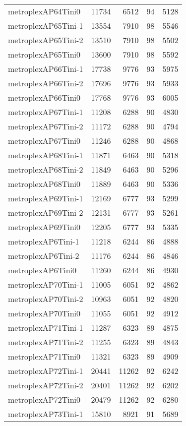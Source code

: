 \begin{longtable}{lrrrr}
metroplexAP64Tini0 & 11734 & 6512 & 94 & 5128 \\
metroplexAP65Tini-1 & 13554 & 7910 & 98 & 5546 \\
metroplexAP65Tini-2 & 13510 & 7910 & 98 & 5502 \\
metroplexAP65Tini0 & 13600 & 7910 & 98 & 5592 \\
metroplexAP66Tini-1 & 17738 & 9776 & 93 & 5975 \\
metroplexAP66Tini-2 & 17696 & 9776 & 93 & 5933 \\
metroplexAP66Tini0 & 17768 & 9776 & 93 & 6005 \\
metroplexAP67Tini-1 & 11208 & 6288 & 90 & 4830 \\
metroplexAP67Tini-2 & 11172 & 6288 & 90 & 4794 \\
metroplexAP67Tini0 & 11246 & 6288 & 90 & 4868 \\
metroplexAP68Tini-1 & 11871 & 6463 & 90 & 5318 \\
metroplexAP68Tini-2 & 11849 & 6463 & 90 & 5296 \\
metroplexAP68Tini0 & 11889 & 6463 & 90 & 5336 \\
metroplexAP69Tini-1 & 12169 & 6777 & 93 & 5299 \\
metroplexAP69Tini-2 & 12131 & 6777 & 93 & 5261 \\
metroplexAP69Tini0 & 12205 & 6777 & 93 & 5335 \\
metroplexAP6Tini-1 & 11218 & 6244 & 86 & 4888 \\
metroplexAP6Tini-2 & 11176 & 6244 & 86 & 4846 \\
metroplexAP6Tini0 & 11260 & 6244 & 86 & 4930 \\
metroplexAP70Tini-1 & 11005 & 6051 & 92 & 4862 \\
metroplexAP70Tini-2 & 10963 & 6051 & 92 & 4820 \\
metroplexAP70Tini0 & 11055 & 6051 & 92 & 4912 \\
metroplexAP71Tini-1 & 11287 & 6323 & 89 & 4875 \\
metroplexAP71Tini-2 & 11255 & 6323 & 89 & 4843 \\
metroplexAP71Tini0 & 11321 & 6323 & 89 & 4909 \\
metroplexAP72Tini-1 & 20441 & 11262 & 92 & 6242 \\
metroplexAP72Tini-2 & 20401 & 11262 & 92 & 6202 \\
metroplexAP72Tini0 & 20479 & 11262 & 92 & 6280 \\
metroplexAP73Tini-1 & 15810 & 8921 & 91 & 5689 \\

\end{longtable}
